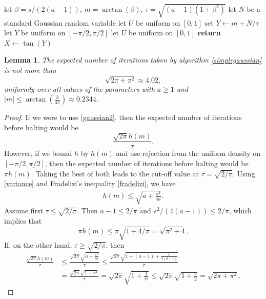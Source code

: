 \documentclass[10pt,a4paper]{amsart}
\newtheorem{lemma}{Lemma}
\newcommand{\inlaw}{\buildrel {\mathcal L} \over =}
\begin{document}
\begin{algorithm}[H]
\caption{PearsonIV generator for $a > 1$ by rejection from the normal density when $\tan (m) \le 3/(4 \pi) \approx 0.2387324$, or equivalently, when $m \le  \arctan(3/(4 \pi)) \approx 0.2344$.}\label{simplegaussian}
\begin{algorithmic}[1]
\State let $\beta = s/(2(a-1))$,  $m = \arctan(\beta)$, $\tau = \sqrt{(a-1)(1+\beta^2 )}$
\Repeat 
\State let $N$ be a standard Gaussian random variable 
\State let $U$ be uniform on $[0,1]$
\State set $Y \leftarrow  m + N/\tau$
\State
{}
\Else
\Repeat 
\State let $Y$ be uniform on $[-\pi/2, \pi/2]$ 
\State let $U$ be uniform on $[0,1]$
\EndIf
\State \textbf {return} $X \leftarrow \tan(Y)$  
\Comment{$X \inlaw P_{a,s}$ }
\end{algorithmic}
\end{algorithm}

\begin{lemma} 
The expected number of iterations taken by algorithm \ref{simplegaussian} is not more than
$$
\sqrt{2 \pi + \pi^2}  \approx 4.02,
$$
uniformly over all values of the parameters with $a \ge 1$ and $|m| \le \arctan \left( \frac{3}{4\pi} \right) \approx 0.2344$.
\end{lemma}

\begin{proof}
If we were to use \eqref{gaussian2}, then the  expected number of iterations before halting would be
$$ 
\frac{ \sqrt{2 \pi}  h(m) } { \tau  } .
$$
However, if we bound $h$ by $h(m)$ and use rejection from the uniform density on $[-\pi/2,\pi/2]$, then the expected number of iterations before halting
would be $\pi h(m)$.  Taking  the best of both leads to the cut-off
value at $\tau = \sqrt{2/\pi }$. 
Using \eqref{variance} and Fradelizi's inequality \eqref{fradelizi}, we have
\begin{align*}
h(m) \le \sqrt{ a + \frac{s^2}{4a}} .
\end{align*}
Assume first $\tau \le \sqrt{2/\pi }$. Then 
$a-1 \le 2/\pi$ and $s^2/(4(a-1)) \le 2/\pi$, which implies that
$$
\pi h(m) \le \pi \sqrt{1 + 4/\pi} = \sqrt{\pi^2 + 4}.
$$
If, on the other hand, $\tau \ge \sqrt{2/\pi }$, then
\begin{align*}
\frac{ \sqrt{2 \pi}  h(m) } { \tau  }
&\le
\frac{ \sqrt{2 \pi}  \sqrt{a +\frac{s^2}{4a} } } { \tau  }
\le
\frac{ \sqrt{2 \pi}  \sqrt{1 +(a-1) +\frac{s^2}{4(a-1)} } } { \tau  }\\
&=
\frac{ \sqrt{2 \pi}  \sqrt{1 + \tau^2 } } { \tau  }
=
\sqrt{2 \pi}  \sqrt{1 + \frac{1}{\tau^2} } 
\le 
\sqrt{2 \pi}  \sqrt{1 + \frac{\pi}{2} } 
=
\sqrt{2 \pi + \pi^2} .
\end{align*}
\end{proof}
\end{document}
